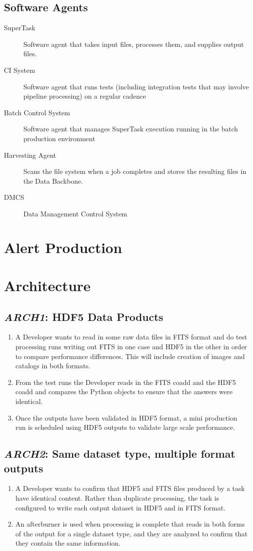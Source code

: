 \documentclass[DM,toc,lsstdraft]{lsstdoc}
\newcommand{\usecase}[3]{%
\subsection{\emph{#1}: #2}
\begin{enumerate}[label=\alph*.]
#3
\end{enumerate}
}
\begin{document}
\subsection{Software Agents}

\begin{description}
\item[SuperTask] Software agent that takes input files, processes them, and supplies output files.
\item[CI System] Software agent that runs tests (including integration tests that may involve pipeline processing) on a regular cadence
\item[Batch Control System] Software agent that manages SuperTask execution running in the batch production environment
\item[Harvesting Agent] Scans the file system when a job completes and stores the resulting files in the Data Backbone.
\item[DMCS] Data Management Control System
\end{description}

\section{Alert Production}

\section{Architecture}

\usecase{ARCH1}{HDF5 Data Products}{%

\item
A Developer wants to read in some raw data files in FITS format and do test processing runs writing out FITS in one case and HDF5 in the other in order to compare performance differences.
This will include creation of images and catalogs in both formats.

\item
From the test runs the Developer reads in the FITS coadd and the HDF5 coadd and compares the Python objects to ensure that the answers were identical.

\item
Once the outputs have been validated in HDF5 format, a mini production run is scheduled using HDF5 outputs to validate large scale performance.
}

\usecase{ARCH2}{Same dataset type, multiple format outputs}{%

\item
A Developer wants to confirm that HDF5 and FITS files produced by a task have identical content. Rather than duplicate processing, the task is configured to write each output dataset in HDF5 and in FITS format.

\item
An afterburner is used when processing is complete that reads in both forms of the output for a single dataset type, and they are analyzed to confirm that they contain the same information.

}
\end{document}
